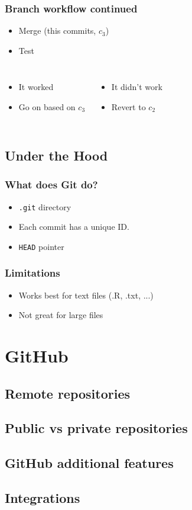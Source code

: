 \documentclass{beamer}
\begin{document}
\begin{frame}[fragile]
    \frametitle{Branch workflow continued}
    \begin{itemize}
        \item Merge (this commits, $c_3$)
        \item Test
    \end{itemize}
    \begin{columns}
        \begin{itemize}
        \item It worked
        \item Go on based on $c_3$
        \end{itemize}
        \begin{itemize}
            \item It didn't work
            \item Revert to $c_2$
        \end{itemize}
    \end{columns}
\end{frame}

\subsection{Under the Hood}

\begin{frame}[fragile]
    \frametitle{What does Git do?}
    \begin{itemize}
        \item \verb|.git| directory
        \item Each commit has a unique ID. 
        \item \verb|HEAD| pointer
    \end{itemize}
\end{frame}

\begin{frame}
    \frametitle{Limitations}
    \begin{itemize}
        \item Works best for text files (.R, .txt, ...)
        \item Not great for large files 
    \end{itemize}
\end{frame}

\section{GitHub}

\subsection{Remote repositories}

\subsection{Public vs private repositories}

\subsection{GitHub additional features}

\subsection{Integrations}
\end{document}
